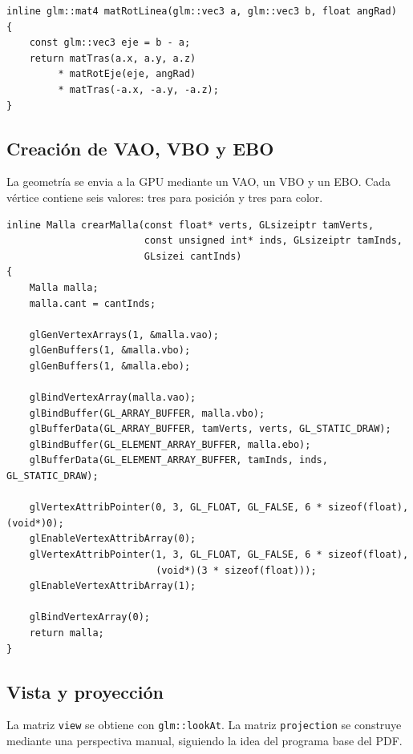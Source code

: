 \documentclass[12pt,a4paper]{article}
\begin{document}
\begin{lstlisting}[style=cxx,caption={Funcion general para rotar alrededor de una linea.}]
inline glm::mat4 matRotLinea(glm::vec3 a, glm::vec3 b, float angRad)
{
    const glm::vec3 eje = b - a;
    return matTras(a.x, a.y, a.z)
         * matRotEje(eje, angRad)
         * matTras(-a.x, -a.y, -a.z);
}
\end{lstlisting}

\subsection*{Creaci\'on de VAO, VBO y EBO}
La geometr\'ia se envia a la GPU mediante un VAO, un VBO y un EBO. Cada v\'ertice contiene seis valores: tres para posici\'on y tres para color.

\begin{lstlisting}[style=cxx,caption={Carga de vertices e indices en buffers de OpenGL.}]
inline Malla crearMalla(const float* verts, GLsizeiptr tamVerts,
                        const unsigned int* inds, GLsizeiptr tamInds,
                        GLsizei cantInds)
{
    Malla malla;
    malla.cant = cantInds;

    glGenVertexArrays(1, &malla.vao);
    glGenBuffers(1, &malla.vbo);
    glGenBuffers(1, &malla.ebo);

    glBindVertexArray(malla.vao);
    glBindBuffer(GL_ARRAY_BUFFER, malla.vbo);
    glBufferData(GL_ARRAY_BUFFER, tamVerts, verts, GL_STATIC_DRAW);
    glBindBuffer(GL_ELEMENT_ARRAY_BUFFER, malla.ebo);
    glBufferData(GL_ELEMENT_ARRAY_BUFFER, tamInds, inds, GL_STATIC_DRAW);

    glVertexAttribPointer(0, 3, GL_FLOAT, GL_FALSE, 6 * sizeof(float), (void*)0);
    glEnableVertexAttribArray(0);
    glVertexAttribPointer(1, 3, GL_FLOAT, GL_FALSE, 6 * sizeof(float),
                          (void*)(3 * sizeof(float)));
    glEnableVertexAttribArray(1);

    glBindVertexArray(0);
    return malla;
}
\end{lstlisting}

\subsection*{Vista y proyecci\'on}
La matriz \texttt{view} se obtiene con \texttt{glm::lookAt}. La matriz \texttt{projection} se construye mediante una perspectiva manual, siguiendo la idea del programa base del PDF.
\end{document}
